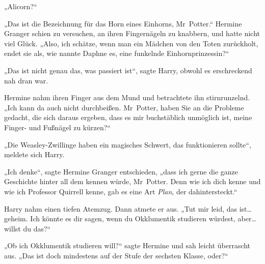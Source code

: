 „Alicorn?“

„Das ist die Bezeichnung für das Horn eines Einhorns, Mr~Potter.“
Hermine Granger schien zu versuchen, an ihren Fingernägeln zu knabbern, und hatte nicht viel Glück. „Also, ich schätze, wenn man ein Mädchen von den Toten zurückholt, endet sie als, wie nannte Daphne es, eine funkelnde Einhornprinzessin?“

„Das ist nicht genau das, was passiert ist“, sagte Harry, obwohl es erschreckend nah dran war.

Hermine nahm ihren Finger aus dem Mund und betrachtete ihn stirnrunzelnd. „Ich kann da auch nicht durchbeißen. Mr~Potter, haben Sie an die Probleme gedacht, die sich daraus ergeben, dass es mir buchstäblich unmöglich ist, meine Finger- und Fußnägel zu kürzen?“

„Die Weasley-Zwillinge haben ein magisches Schwert, das funktionieren sollte“, meldete sich Harry.

„Ich denke“, sagte Hermine Granger entschieden, „dass ich gerne die ganze Geschichte hinter all dem kennen würde, Mr~Potter. Denn wie ich dich kenne und wie ich Professor Quirrell kenne, gab es eine Art \emph{Plan}, der dahintersteckt.“

Harry nahm einen tiefen Atemzug. Dann atmete er aus. „Tut mir leid, das ist…geheim. Ich könnte es dir sagen, wenn du Okklumentik studieren würdest, aber…willst du das?“

„Ob ich Okklumentik studieren will?“ sagte Hermine und sah leicht überrascht aus. „Das ist doch mindestens auf der Stufe der sechsten Klasse, oder?“

